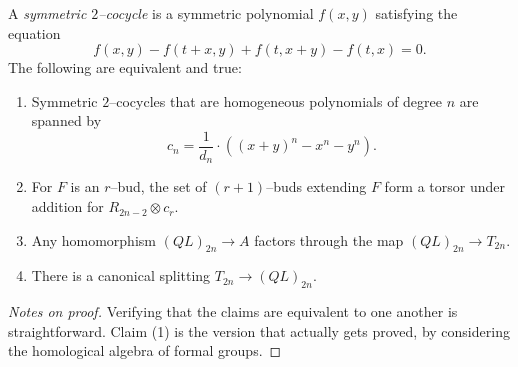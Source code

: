 \begin{lemma}\label{Symmetric2CocycleLemma}
A \textit{symmetric $2$--cocycle} is a symmetric polynomial $f(x, y)$ satisfying the equation \[f(x, y) - f(t + x, y) + f(t, x + y) - f(t, x) = 0.\]  The following are equivalent and true:
\begin{enumerate}
\item Symmetric $2$--cocycles that are homogeneous polynomials of degree $n$ are spanned by \[c_n = \frac{1}{d_n} \cdot ((x + y)^n - x^n - y^n).\]
\item For $F$ is an $r$--bud, the set of $(r+1)$--buds extending $F$ form a torsor under addition for $R_{2n-2} \otimes c_r$.
\item Any homomorphism $(QL)_{2n} \to A$ factors through the map $(QL)_{2n} \to T_{2n}$.
\item There is a canonical splitting $T_{2n} \to (QL)_{2n}$.
\end{enumerate}
\end{lemma}
\begin{proof}[Notes on proof]
Verifying that the claims are equivalent to one another is straightforward.  Claim (1) is the version that actually gets proved, by considering the homological algebra of formal groups.
\end{proof}


